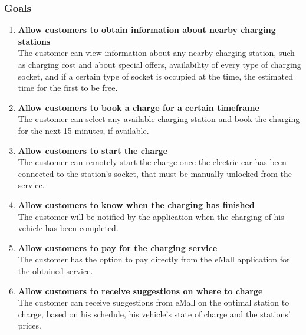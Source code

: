 \subsubsection{Goals}
\begin{enumerate}[label=$\bullet$ \textbf{G\arabic*:}]
        \item \textbf{Allow customers to obtain information about nearby charging stations}
        \\
        The customer can view information about any nearby charging station,  
        such as charging cost and about special offers, availability of every type of charging socket, 
        and if a certain type of socket is occupied at the time,
         the estimated time for the first to be free.
        \item \textbf{Allow customers to book a charge for a certain timeframe}
        \\
        The customer can select any available charging station and book the charging for the next 15 minutes, if available. 
        \item \textbf{Allow customers to start the charge}
        \\
        The customer can remotely start the charge once the electric car has been connected to the station's socket, that must be manually unlocked from the service.
        \item \textbf{Allow customers to know when the charging has finished}
        \\
        The customer will be notified by the application when the charging of his vehicle has been completed.
        \item \textbf{Allow customers to pay for the charging service}
        \\
        The customer has the option to pay directly from the eMall application for the obtained service.
        \item \textbf{Allow customers to receive suggestions on where to charge}
        \\
        The customer can receive suggestions from eMall on the optimal station to charge, based on his schedule, his vehicle's state of charge and the stations' prices.
        

\end{enumerate}
